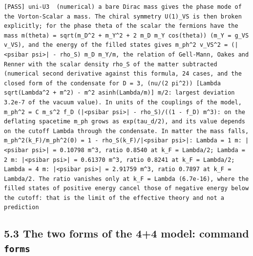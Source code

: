 \documentclass[
  10pt,
]{article}
\begin{document}
\begin{verbatim}
[PASS] uni-U3  (numerical) a bare Dirac mass gives the phase mode of the Vorton-Scalar a mass. The chiral symmetry U(1)_VS is then broken explicitly; for the phase theta of the scalar the fermions have the mass m(theta) = sqrt(m_D^2 + m_Y^2 + 2 m_D m_Y cos(theta)) (m_Y = g_VS v_VS), and the energy of the filled states gives m_ph^2 v_VS^2 = (|<psibar psi>| - rho_S) m_D m_Y/m, the relation of Gell-Mann, Oakes and Renner with the scalar density rho_S of the matter subtracted (numerical second derivative against this formula, 24 cases, and the closed form of the condensate for D = 3, (nu/(2 pi^2)) [Lambda sqrt(Lambda^2 + m^2) - m^2 asinh(Lambda/m)] m/2: largest deviation 3.2e-7 of the vacuum value). In units of the couplings of the model, m_ph^2 = C m_s^2 f_D (|<psibar psi>| - rho_S)/((1 - f_D) m^3): on the deflating spacetime m_ph grows as exp(tau_d/2), and its value depends on the cutoff Lambda through the condensate. In matter the mass falls, m_ph^2(k_F)/m_ph^2(0) = 1 - rho_S(k_F)/|<psibar psi>|: Lambda = 1 m: |<psibar psi>| = 0.10798 m^3, ratio 0.8540 at k_F = Lambda/2; Lambda = 2 m: |<psibar psi>| = 0.61370 m^3, ratio 0.8241 at k_F = Lambda/2; Lambda = 4 m: |<psibar psi>| = 2.91759 m^3, ratio 0.7897 at k_F = Lambda/2. The ratio vanishes only at k_F = Lambda (6.7e-16), where the filled states of positive energy cancel those of negative energy below the cutoff: that is the limit of the effective theory and not a prediction
\end{verbatim}

\hypertarget{the-two-forms-of-the-44-model-command-forms}{%
\subsection{\texorpdfstring{5.3 The two forms of the 4+4 model: command
\texttt{forms}}{5.3 The two forms of the 4+4 model: command forms}}\label{the-two-forms-of-the-44-model-command-forms}}
\end{document}
